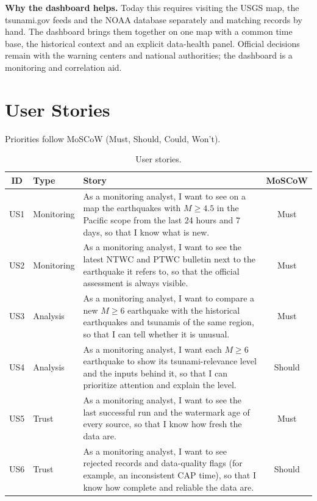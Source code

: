 \documentclass[a4paper,11pt,oneside]{book}
\begin{document}
\textbf{Why the dashboard helps.} Today this requires visiting the USGS map, the tsunami.gov feeds and the NOAA database separately and matching records by hand.
The dashboard brings them together on one map with a common time base, the historical context and an explicit data-health panel.
Official decisions remain with the warning centers and national authorities; the dashboard is a monitoring and correlation aid.

\section{User Stories}
Priorities follow MoSCoW (Must, Should, Could, Won't).

\begin{table}[H]
\centering
\small
\begin{tabularx}{\textwidth}{@{}cl>{\raggedright\arraybackslash}Xc@{}}
\toprule
ID & Type & Story & MoSCoW \\
\midrule
US1 & Monitoring & As a monitoring analyst, I want to see on a map the earthquakes with $M \geq 4.5$ in the Pacific scope from the last 24 hours and 7 days, so that I know what is new. & Must \\
US2 & Monitoring & As a monitoring analyst, I want to see the latest NTWC and PTWC bulletin next to the earthquake it refers to, so that the official assessment is always visible. & Must \\
US3 & Analysis & As a monitoring analyst, I want to compare a new $M \geq 6$ earthquake with the historical earthquakes and tsunamis of the same region, so that I can tell whether it is unusual. & Must \\
US4 & Analysis & As a monitoring analyst, I want each $M \geq 6$ earthquake to show its tsunami-relevance level and the inputs behind it, so that I can prioritize attention and explain the level. & Should \\
US5 & Trust & As a monitoring analyst, I want to see the last successful run and the watermark age of every source, so that I know how fresh the data are. & Must \\
US6 & Trust & As a monitoring analyst, I want to see rejected records and data-quality flags (for example, an inconsistent CAP time), so that I know how complete and reliable the data are. & Should \\
\bottomrule
\end{tabularx}
\caption{User stories.}
\label{tab:stories}
\end{table}
\end{document}
